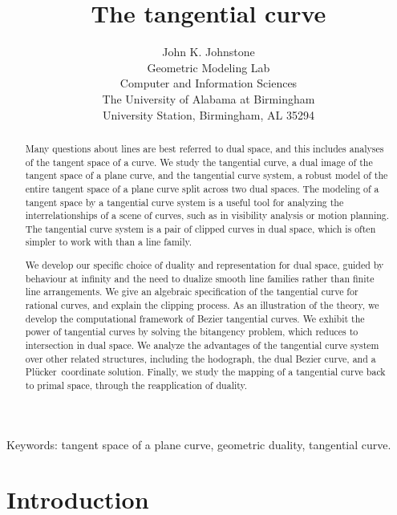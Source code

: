 \documentclass[12pt]{article}
\title{The tangential curve}
\author{John K. Johnstone\\
	Geometric Modeling Lab\\
	Computer and Information Sciences\\
	The University of Alabama at Birmingham\\
	University Station, Birmingham, AL 35294}
\newcommand{\plucker}{Pl\"{u}cker\ }
\begin{document}
\maketitle


\begin{abstract}
Many questions about lines are best referred to dual space, 
and this includes analyses of the tangent space of a curve.
We study the tangential curve, a dual image of the tangent space of
a plane curve, and the tangential curve system, a robust model of the entire tangent
space of a plane curve split across two dual spaces.
The modeling of a tangent space by a tangential curve system
is a useful tool for analyzing the interrelationships of a scene of curves, 
such as in visibility analysis or motion planning.
The tangential curve system is a pair of clipped curves in dual space, which is
often simpler to work with than a line family.

We develop our specific choice of duality and representation for dual space,
guided by behaviour at infinity and the need to dualize smooth
line families rather than finite line arrangements.
We give an algebraic specification of the tangential curve for 
rational curves, and explain the clipping process.
As an illustration of the theory, 
we develop the computational framework of Bezier tangential curves.
We exhibit the power of tangential curves by solving the bitangency problem,
which reduces to intersection in dual space.
We analyze the advantages of the tangential curve system over other 
related structures, including the hodograph, the dual Bezier curve, and a
\plucker coordinate solution.
Finally, we study the mapping of a tangential curve back to
primal space, through the reapplication of duality.
\end{abstract}

\noindent Keywords: tangent space of a plane curve, geometric duality,
		    tangential curve.

\clearpage






\section{Introduction}
\end{document}
